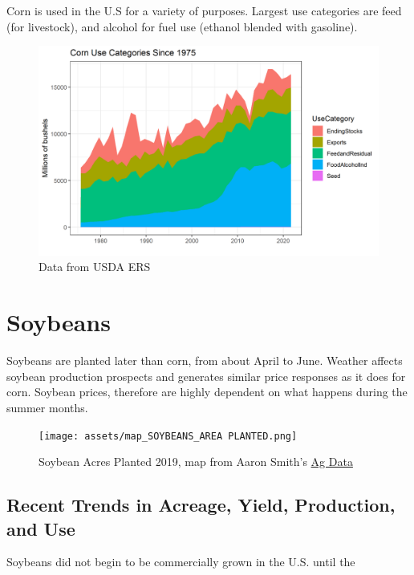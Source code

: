 \documentclass[
]{book}
\begin{document}
Corn is used in the U.S for a variety of purposes. Largest use categories are feed (for livestock), and alcohol for fuel use (ethanol blended with gasoline).

\begin{figure}
\centering
\includegraphics{assets/PrimerforGrain_CornUse.png}
\caption{Data from USDA ERS}
\end{figure}

\hypertarget{soybeans}{%
\section{Soybeans}\label{soybeans}}

Soybeans are planted later than corn, from about April to June. Weather affects soybean production prospects and generates similar price responses as it does for corn. Soybean prices, therefore are highly dependent on what happens during the summer months.

\begin{figure}
\centering
\texttt{[image: assets/map\_SOYBEANS\_AREA PLANTED.png]}
\caption{Soybean Acres Planted 2019, map from Aaron Smith's \href{https://asmith.ucdavis.edu/data/us-crops}{Ag Data}}
\end{figure}

\hypertarget{recent-trends-in-acreage-yield-production-and-use}{%
\subsection{Recent Trends in Acreage, Yield, Production, and Use}\label{recent-trends-in-acreage-yield-production-and-use}}

Soybeans did not begin to be commercially grown in the U.S. until the
\end{document}
